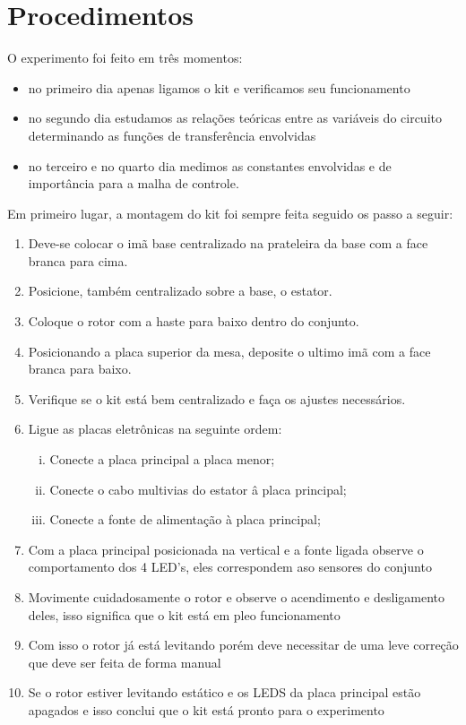 \section{Procedimentos}
O experimento foi feito em três momentos:
\begin{itemize}
\item no primeiro dia apenas ligamos o kit e verificamos seu funcionamento 
\item no segundo dia estudamos as relações teóricas entre as variáveis do circuito determinando as funções de transferência envolvidas
\item no terceiro e no quarto dia medimos as constantes envolvidas e de importância para a malha de controle.
\end{itemize}

Em primeiro lugar, a montagem do kit foi sempre feita seguido os passo a seguir:

\begin{enumerate}
    \item Deve-se colocar o imã base centralizado na prateleira da base com a face branca para cima.
    \item Posicione, também centralizado sobre a base, o estator.
    \item Coloque o rotor com a haste para baixo dentro do conjunto.
    \item Posicionando a placa superior da mesa, deposite o ultimo imã com a face branca para baixo.
    \item Verifique se o kit está bem centralizado e faça os ajustes necessários.
    \item Ligue as placas eletrônicas na seguinte ordem:
    \begin{enumerate}[i.]
        \item Conecte a placa principal a placa menor;
        \item Conecte o cabo multivias do estator â placa principal;
        \item Conecte a fonte de alimentação à placa principal;
    \end{enumerate}
    \item Com a placa principal posicionada na vertical e a fonte ligada observe o comportamento dos 4 LED's, eles correspondem aso sensores do conjunto
    \item Movimente cuidadosamente o rotor e observe o acendimento e desligamento deles, isso significa que o kit está em pleo funcionamento
    \item Com isso o rotor já está levitando porém deve necessitar de uma leve correção que deve ser feita de forma manual
    \item Se o rotor estiver levitando estático e os LEDS da placa principal estão apagados e isso conclui que o kit está pronto para o experimento
\end{enumerate}

